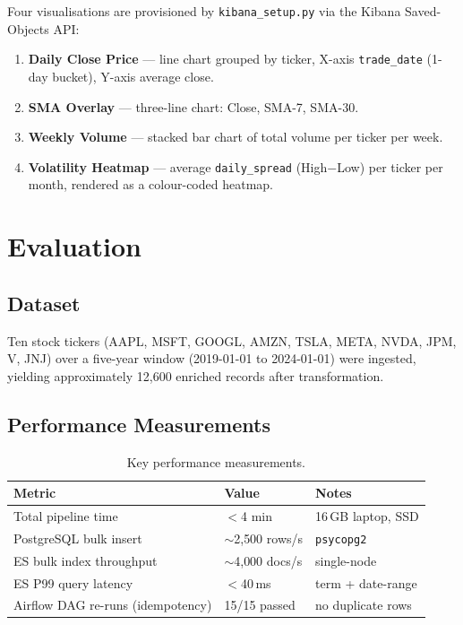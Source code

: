 \documentclass[conference]{IEEEtran}
\begin{document}
Four visualisations are provisioned by \texttt{kibana\_setup.py} via the
Kibana Saved-Objects API:

\begin{enumerate}
  \item \textbf{Daily Close Price} — line chart grouped by ticker, X-axis
    \texttt{trade\_date} (1-day bucket), Y-axis average close.
  \item \textbf{SMA Overlay} — three-line chart: Close, SMA-7, SMA-30.
  \item \textbf{Weekly Volume} — stacked bar chart of total volume per ticker
    per week.
  \item \textbf{Volatility Heatmap} — average \texttt{daily\_spread}
    (High$-$Low) per ticker per month, rendered as a colour-coded heatmap.
\end{enumerate}

\section{Evaluation}

\subsection{Dataset}

Ten stock tickers (AAPL, MSFT, GOOGL, AMZN, TSLA, META, NVDA, JPM, V, JNJ)
over a five-year window (2019-01-01 to 2024-01-01) were ingested, yielding
approximately 12{,}600 enriched records after transformation.

\subsection{Performance Measurements}

\begin{table}[ht]
  \centering
  \caption{Key performance measurements.}
  \label{tab:perf}
  \begin{tabular}{lll}
    \toprule
    Metric & Value & Notes \\
    \midrule
    Total pipeline time & $<$4 min & 16\,GB laptop, SSD \\
    PostgreSQL bulk insert & $\sim$2{,}500 rows/s & \texttt{psycopg2} \\
    ES bulk index throughput & $\sim$4{,}000 docs/s & single-node \\
    ES P99 query latency & $<$40\,ms & term + date-range \\
    Airflow DAG re-runs (idempotency) & 15/15 passed & no duplicate rows \\
    \bottomrule
  \end{tabular}
\end{table}
\end{document}
